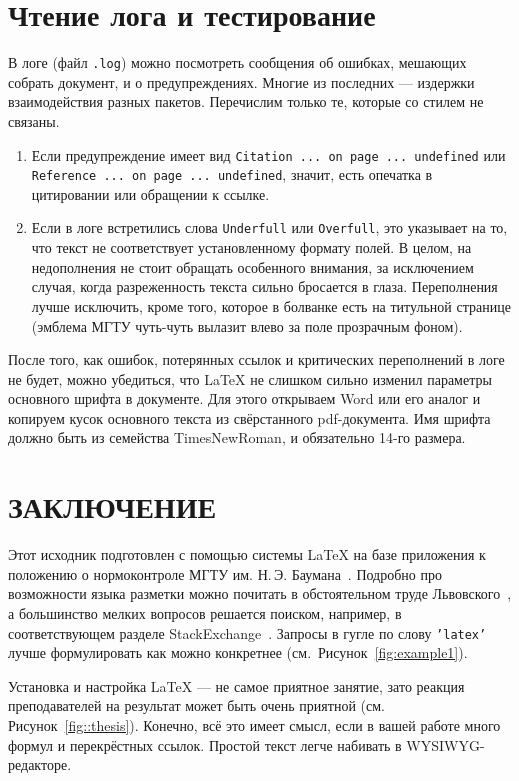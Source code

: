 \documentclass[14pt, russian]{scrartcl}
\newcommand{\anonsection}[1]{\cleardoublepage
\phantomsection
\addcontentsline{toc}{section}{\protect\numberline{}#1}
\section*{#1}\vspace*{2.5ex} %
}
\begin{document}
\section{Чтение лога и тестирование}

В логе (файл \texttt{.log}) можно посмотреть сообщения об ошибках, мешающих собрать документ, и о предупреждениях. Многие из последних --- издержки взаимодействия разных пакетов. Перечислим только те, которые со стилем не связаны.

\begin{enumerate}
\item Если предупреждение имеет вид \texttt{Citation ... on page ... undefined} или \texttt{Reference ... on page ... undefined}, значит, есть опечатка в цитировании или обращении к ссылке.
\item Если в логе встретились слова \texttt{Underfull} или \texttt{Overfull}, это указывает на то, что текст не соответствует установленному формату полей. В целом, на недополнения не стоит обращать особенного внимания, за исключением случая, когда разреженность текста сильно бросается в глаза. Переполнения лучше исключить, кроме того, которое в болванке есть на титульной странице (эмблема МГТУ чуть-чуть вылазит влево за поле прозрачным фоном).
\end{enumerate}

После того, как ошибок, потерянных ссылок и критических переполнений в логе не будет, можно убедиться, что \LaTeX{} не слишком сильно изменил параметры основного шрифта в документе. Для этого открываем Word или его аналог и копируем кусок основного текста из свёрстанного pdf-документа. Имя шрифта должно быть из семейства  TimesNewRoman, и обязательно 14-го размера.

 \anonsection{ЗАКЛЮЧЕНИЕ} %

Этот исходник подготовлен с помощью системы \LaTeX{} на базе приложения к положению о нормоконтроле МГТУ им. Н.\,Э. Баумана~\cite{Normcor}. Подробно про возможности языка разметки можно почитать в обстоятельном труде Львовского~\cite{LaTeX2e}, а большинство мелких вопросов решается поиском, например, в соответствующем разделе StackExchange~\cite{Stackexchange}. Запросы в гугле по слову \texttt{'latex'} лучше формулировать как можно конкретнее (см.~Рисунок~\ref{fig:example1}). 

Установка и настройка \LaTeX{} --- не самое приятное занятие, зато реакция преподавателей на результат может быть очень приятной (см. Рисунок~\ref{fig::thesis}). Конечно, всё это имеет смысл, если в вашей работе много формул и перекрёстных ссылок. Простой текст легче набивать в WYSIWYG-редакторе.
\end{document}
